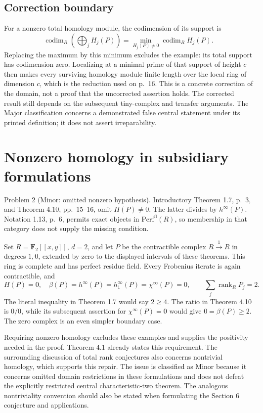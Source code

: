 \documentclass[10pt]{article}
\begin{document}
\subsection*{Correction boundary}
For a nonzero total homology module, the codimension of its support is \[\operatorname{codim}_R\!\left(\bigoplus_j H_j(P)\right)
 =\min_{H_j(P)\ne0}\operatorname{codim}_R H_j(P).\] Replacing the maximum by this minimum excludes the example: its total support has codimension zero. Localizing at a minimal prime of that support of height \(c\) then makes every surviving homology module finite length over the local ring of dimension \(c\), which is the reduction used on p. 16. This is a concrete correction of the domain, not a proof that the uncorrected assertion holds. The corrected result still depends on the subsequent tiny-complex and transfer arguments. The Major classification concerns a demonstrated false central statement under its printed definition; it does not assert irreparability.\par
\section*{Nonzero homology in subsidiary formulations}
Problem 2 (Minor: omitted nonzero hypothesis).  Introductory Theorem 1.7, p. 3, and Theorem 4.10, pp. 15–16, omit \(H(P)\ne0\). The latter divides by \(h^\infty(P)\). Notation 1.13, p. 6, permits exact objects in \(\mathrm{Perf}^{\mathrm{fl}}(R)\), so membership in that category does not supply the missing condition.\par
Set \(R=\mathbf F_2[[x,y]]\), \(d=2\), and let \(P\) be the contractible complex \(R\xrightarrow{1}R\) in degrees \(1,0\), extended by zero to the displayed intervals of these theorems. This ring is complete and has perfect residue field. Every Frobenius iterate is again contractible, and \[H(P)=0,\quad \beta(P)=h^\infty(P)=h_1^\infty(P)
       =\chi^\infty(P)=0,\qquad
 \sum_j\operatorname{rank}_RP_j=2.\] The literal inequality in Theorem 1.7 would say \(2\ge4\). The ratio in Theorem 4.10 is \(0/0\), while its subsequent assertion for \(\chi^\infty(P)=0\) would give \(0=\beta(P)\ge2\). The zero complex is an even simpler boundary case.\par
Requiring nonzero homology excludes these examples and supplies the positivity needed in the proof. Theorem 4.1 already states this requirement. The surrounding discussion of total rank conjectures also concerns nontrivial homology, which supports this repair. The issue is classified as Minor because it concerns omitted domain restrictions in these formulations and does not defeat the explicitly restricted central characteristic-two theorem. The analogous nontriviality convention should also be stated when formulating the Section 6 conjecture and applications.\par
\end{document}
